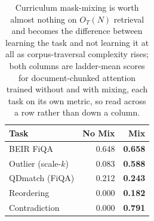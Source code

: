 \begin{table}
\centering
\small
\setlength{\tabcolsep}{5pt}
\begin{tabular}{lrr}
\toprule
Task & No Mix & Mix \\
\midrule
BEIR FiQA & 0.648 & \textbf{0.658} \\
Outlier (scale-$k$) & 0.083 & \textbf{0.588} \\
QDmatch (FiQA) & 0.212 & \textbf{0.243} \\
Reordering & 0.000 & \textbf{0.182} \\
Contradiction & 0.000 & \textbf{0.791} \\
\bottomrule
\end{tabular}
\caption{Curriculum mask-mixing is worth almost nothing on $O_T(N)$ retrieval and becomes the difference between learning the task and not learning it at all as corpus-traversal complexity rises; both columns are ladder-mean scores for document-chunked attention trained without and with mixing, each task on its own metric, so read across a row rather than down a column.}
\label{tab:maskmix}
\end{table}
